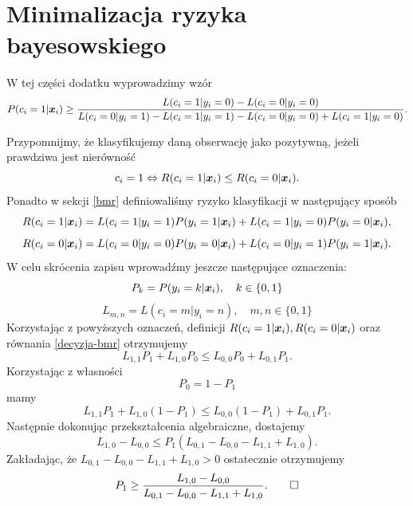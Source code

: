 \documentclass[inzynierska]{pwr_wmat_praca_dyplomowa}
\theoremstyle{plain}
\numberwithin{theorem}{chapter}
\theoremstyle{definition}
\numberwithin{theorem}{chapter}
\begin{document}

\appendix

\chapter{Minimalizacja ryzyka bayesowskiego}
\label{bmr-proof}
W tej części dodatku wyprowadzimy wzór 
$$ P(c_i = 1|\boldsymbol{x}_{i}) \ge \frac{L(c_i = 1|y_i = 0) - L(c_i = 0|y_i = 0)}{L(c_i = 0|y_i = 1) - L(c_i = 1|y_i = 1) - L(c_i = 0|y_i = 0) + L(c_i = 1|y_i = 0)} \text{.}$$

Przypomnijmy, że klasyfikujemy daną obserwację jako pozytywną, jeżeli prawdziwa jest  nierówność
\begin{equation}
	\label{decyzja-bmr}
	c_i = 1 \Leftrightarrow R(c_i = 1|\boldsymbol{x}_{i}) \leq R(c_i = 0|\boldsymbol{x}_{i}) \text{.}
\end{equation}
Ponadto w sekcji \ref{bmr} definiowaliśmy ryzyko klasyfikacji w następujący sposób
$$ R(c_i = 1|\boldsymbol{x}_{i}) = L(c_i = 1|y_i = 1)P(y_i = 1|\boldsymbol{x}_{i}) + L(c_i = 1|y_i = 0)P(y_i = 0|\boldsymbol{x}_{i}) \text{,}$$
$$ R(c_i = 0|\boldsymbol{x}_{i}) = L(c_i = 0|y_i = 0)P(y_i = 0|\boldsymbol{x}_{i}) + L(c_i = 0|y_i = 1)P(y_i = 1|\boldsymbol{x}_{i}) \text{.}$$
W celu skrócenia zapisu wprowadźmy jeszcze następujące oznaczenia:
$$ P_k = P(y_i = k|\boldsymbol{x}_{i}), \quad k \in \{0,1\} $$
$$ L_{m,n} = L(c_i = m|y_i = n), \quad m,n \in \{0,1\}$$
Korzystając z powyższych oznaczeń, definicji $R(c_i = 1|\boldsymbol{x}_{i}), R(c_i = 0|\boldsymbol{x}_{i})$ oraz równania \ref{decyzja-bmr} otrzymujemy
$$ L_{1,1}P_1 + L_{1,0}P_0 \leq L_{0,0}P_0 + L_{0,1}P_1 \text{.}$$
Korzystając z własności 
$$ P_0 = 1 - P_1 $$
mamy
$$ L_{1,1}P_1 + L_{1,0}(1-P_1) \leq L_{0,0}(1-P_1) + L_{0,1}P_1 \text{.}$$
Następnie dokonując przekształcenia algebraiczne, dostajemy
$$ L_{1,0}-L_{0,0} \leq P_1 (L_{0,1} - L_{0,0} - L_{1,1} + L_{1,0}) \text{.} $$
Zakładając, że $L_{0,1} - L_{0,0} - L_{1,1} + L_{1,0} > 0$ ostatecznie otrzymujemy
$$ P_1 \geq \frac{L_{1,0}-L_{0,0}}{L_{0,1} - L_{0,0} - L_{1,1} + L_{1,0}}. \qed $$
\backmatter
\nocite{*}

\end{document}
